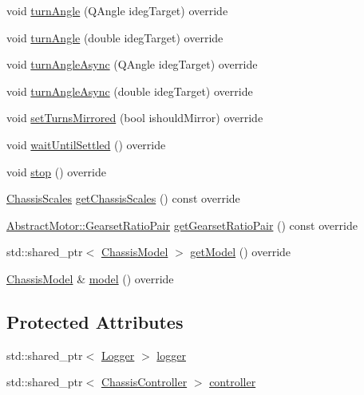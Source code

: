 \begin{DoxyCompactItemize}
\item 
void \mbox{\hyperlink{classokapi_1_1DefaultOdomChassisController_a4ba07ac4bea9ff2d8aea30be72f6a0ea}{turn\+Angle}} (Q\+Angle ideg\+Target) override
\item 
void \mbox{\hyperlink{classokapi_1_1DefaultOdomChassisController_a05a8a6684b3afe4f7c2ecbc24699f70d}{turn\+Angle}} (double ideg\+Target) override
\item 
void \mbox{\hyperlink{classokapi_1_1DefaultOdomChassisController_a18d748097a7938e3102638d17be54c76}{turn\+Angle\+Async}} (Q\+Angle ideg\+Target) override
\item 
void \mbox{\hyperlink{classokapi_1_1DefaultOdomChassisController_a948978204fc6f2a2443025dfdb0241b1}{turn\+Angle\+Async}} (double ideg\+Target) override
\item 
void \mbox{\hyperlink{classokapi_1_1DefaultOdomChassisController_aed92ba0b7a9fc15bf645f3789e8598ae}{set\+Turns\+Mirrored}} (bool ishould\+Mirror) override
\item 
void \mbox{\hyperlink{classokapi_1_1DefaultOdomChassisController_a44599379129060bdb44e6f603ee5777b}{wait\+Until\+Settled}} () override
\item 
void \mbox{\hyperlink{classokapi_1_1DefaultOdomChassisController_af6a98415e2c4e17dfec77e215efb1a41}{stop}} () override
\item 
\mbox{\hyperlink{classokapi_1_1ChassisScales}{Chassis\+Scales}} \mbox{\hyperlink{classokapi_1_1DefaultOdomChassisController_afa07913b30d47c790fcdce8c2b85a468}{get\+Chassis\+Scales}} () const override
\item 
\mbox{\hyperlink{structokapi_1_1AbstractMotor_1_1GearsetRatioPair}{Abstract\+Motor\+::\+Gearset\+Ratio\+Pair}} \mbox{\hyperlink{classokapi_1_1DefaultOdomChassisController_a6912dbe99776f79fb3a6990e2fbea2ff}{get\+Gearset\+Ratio\+Pair}} () const override
\item 
std\+::shared\+\_\+ptr$<$ \mbox{\hyperlink{classokapi_1_1ChassisModel}{Chassis\+Model}} $>$ \mbox{\hyperlink{classokapi_1_1DefaultOdomChassisController_a83e8bf7115086c331ada990ceb872bf1}{get\+Model}} () override
\item 
\mbox{\hyperlink{classokapi_1_1ChassisModel}{Chassis\+Model}} \& \mbox{\hyperlink{classokapi_1_1DefaultOdomChassisController_aa917086153b6298bf7792fd3b31ac240}{model}} () override
\end{DoxyCompactItemize}
\subsection*{Protected Attributes}
\begin{DoxyCompactItemize}
\item 
std\+::shared\+\_\+ptr$<$ \mbox{\hyperlink{classokapi_1_1Logger}{Logger}} $>$ \mbox{\hyperlink{classokapi_1_1DefaultOdomChassisController_a1e34483ae1bcef368d80b69f54a3b091}{logger}}
\item 
std\+::shared\+\_\+ptr$<$ \mbox{\hyperlink{classokapi_1_1ChassisController}{Chassis\+Controller}} $>$ \mbox{\hyperlink{classokapi_1_1DefaultOdomChassisController_a0513b32bd09e7af2b82a5d67895b6165}{controller}}
\end{DoxyCompactItemize}
